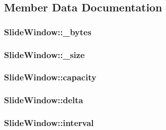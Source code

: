\subsection{\-Member \-Data \-Documentation}
\hypertarget{structSlideWindow_a382db31c0b6736a0c590b9a191c648be}{
\subsubsection[{\-\_\-bytes}]{ {\bf \-Slide\-Window\-::\-\_\-bytes}}}\label{structSlideWindow_a382db31c0b6736a0c590b9a191c648be}
\hypertarget{structSlideWindow_a747cbf33471465805a9582d6f0daf989}{
\subsubsection[{\-\_\-size}]{ {\bf \-Slide\-Window\-::\-\_\-size}}}\label{structSlideWindow_a747cbf33471465805a9582d6f0daf989}
\hypertarget{structSlideWindow_a06c92be97a32ca99a9f2d797f6be73f7}{
\subsubsection[{capacity}]{ {\bf \-Slide\-Window\-::capacity}}}\label{structSlideWindow_a06c92be97a32ca99a9f2d797f6be73f7}
\hypertarget{structSlideWindow_a656aa0cedc3cb4b060b1cc1b7059d3ef}{
\subsubsection[{delta}]{ {\bf \-Slide\-Window\-::delta}}}\label{structSlideWindow_a656aa0cedc3cb4b060b1cc1b7059d3ef}
\hypertarget{structSlideWindow_a69f61dc9df272d8c5f2723b142dab638}{
\subsubsection[{interval}]{ {\bf \-Slide\-Window\-::interval}}}\label{structSlideWindow_a69f61dc9df272d8c5f2723b142dab638}
